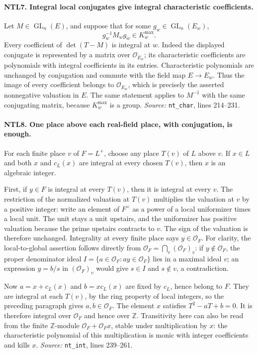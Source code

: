 \paragraph{NTL7. Integral local conjugates give integral characteristic coefficients.}
\label{claim:NTL7}
Let \(M\in\operatorname{GL}_n(E)\), and suppose that for some
\(g_w\in\operatorname{GL}_n(E_w)\),
\[
 g_w^{-1}M_wg_w\in K_w^{\max}.
\]
Every coefficient of \(\det(T-M)\) is integral at \(w\).  Indeed the
displayed conjugate is represented by a matrix over
\(\mathcal O_{E_w}\); its characteristic coefficients are polynomials
with integral coefficients in its entries.  Characteristic
polynomials are unchanged by conjugation and commute with the field
map \(E\longrightarrow E_w\).  Thus the image of every coefficient
belongs to \(\mathcal O_{E_w}\), which is precisely the asserted
nonnegative valuation in \(E\).  The same statement applies to
\(M^{-1}\) with the same conjugating matrix, because
\(K_w^{\max}\) is a group.
\emph{Source:} \texttt{nt\_char}, lines 214--231.

\paragraph{NTL8. One place above each real-field place, with conjugation, is enough.}
\label{claim:NTL8}
For each finite place \(v\) of \(F=L^+\), choose any place \(T(v)\)
of \(L\) above \(v\).  If \(x\in L\) and both \(x\) and
\(c_L(x)\) are integral at every chosen \(T(v)\), then \(x\) is
an algebraic integer.

First, if \(y\in F\) is integral at every \(T(v)\), then it is
integral at every \(v\).  The restriction of the normalized valuation
at \(T(v)\) multiplies the valuation at \(v\) by a positive integer:
write an element of \(F^\times\) as a power of a local uniformizer
times a local unit.  The unit stays a unit upstairs, and the
uniformizer has positive valuation because the prime upstairs
contracts to \(v\).  The sign of the valuation is therefore unchanged.
Integrality at every finite place says \(y\in\mathcal O_F\).
For clarity, the local-to-global assertion follows directly from
\(\mathcal O_F=\bigcap_v(\mathcal O_F)_v\): if \(y\notin\mathcal O_F\),
the proper denominator ideal
\(I=\{a\in\mathcal O_F:ay\in\mathcal O_F\}\) lies in a maximal
ideal \(v\); an expression \(y=b/s\) in \((\mathcal O_F)_v\)
would give \(s\in I\) and \(s\notin v\), a contradiction.

Now \(a=x+c_L(x)\) and \(b=xc_L(x)\) are fixed by \(c_L\), hence
belong to \(F\).  They are integral at each \(T(v)\), by the ring
property of local integers, so the preceding paragraph gives
\(a,b\in\mathcal O_F\).  The element \(x\) satisfies
\(T^2-aT+b=0\).  It is therefore integral over \(\mathcal O_F\)
and hence over \(\mathbb Z\).  Transitivity here can also be read
from the finite \(\mathbb Z\)-module
\(\mathcal O_F+\mathcal O_Fx\), stable under multiplication by \(x\):
the characteristic polynomial of this multiplication is monic
with integer coefficients and kills \(x\).
\emph{Source:} \texttt{nt\_int}, lines 239--261.

